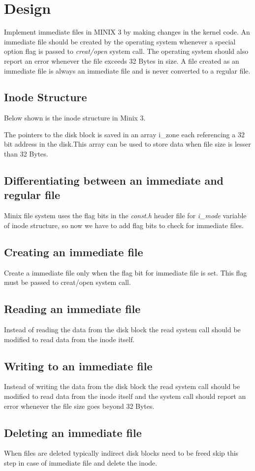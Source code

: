 \chapter{Design}

Implement immediate files in MINIX 3 by making changes in the kernel code. An immediate file should be created by the operating system whenever a special option flag is passed to {\em creat/open } system call. The operating system should also report an error whenever the file exceeds 32 Bytes in size. A file created as an immediate file is always an immediate file and is never converted to a regular file.

\section{Inode Structure}
Below shown is the inode structure in Minix 3.



The pointers to the disk block is saved in an array i\_zone each referencing a 32 bit address in the disk.This array can be used to store data when file size is lesser than 32 Bytes. 

\section{Differentiating between an immediate and regular file}

Minix file system uses the flag bits in the {\em const.h} header file for { \em i\_mode} variable of inode structure, so now we have to add flag bits to check for immediate files.

\section{Creating an immediate file}
Create a immediate file only when the flag bit for immediate file is set. This flag must be passed to creat/open system call.
\section{Reading an immediate file}
Instead of reading the data from the disk block the read system call should be modified to read data from the inode itself.
\section{Writing to an immediate file}
Instead of writing the data from the disk block the read system call should be modified to read data from the inode itself and the system call should report an error whenever the file size goes beyond 32 Bytes.
\section{Deleting an immediate file}
When files are deleted typically indirect disk blocks need to be freed skip this step in case of immediate file and delete the inode.
